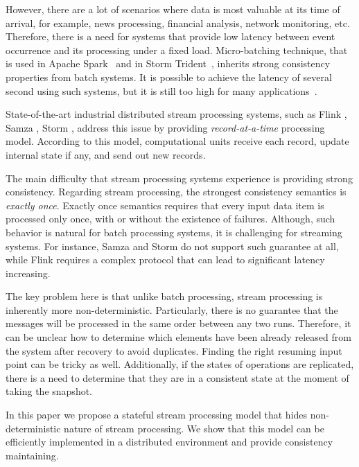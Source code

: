 \documentclass[sigconf]{acmart}
\theoremstyle{remark}
\begin{document}
However, there are a lot of scenarios where data is most valuable at its time of arrival, for example, news processing, financial analysis, network monitoring, etc. Therefore, there is a need for systems that provide low latency between event occurrence and its processing under a fixed load. Micro-batching technique, that is used in Apache Spark~\cite{Zaharia:2012:DSE:2342763.2342773} and in Storm Trident~\cite{apache:storm:trident}, inherits strong consistency properties from batch systems. It is possible to achieve the latency of several second using such systems, but it is still too high for many applications~\cite{?}.

State-of-the-art industrial distributed stream processing systems, such as Flink \cite{carbone2015apache}, Samza \cite{Noghabi:2017:SSS:3137765.3137770}, Storm \cite{apache:storm}, address this issue by providing {\it record-at-a-time} processing model. According to this model, computational units receive each record, update internal state if any, and send out new records. 

The main difficulty that stream processing systems experience is providing strong consistency. Regarding stream processing, the strongest consistency semantics is {\it exactly once}. Exactly once semantics requires that every input data item is processed only once, with or without the existence of failures. Although, such behavior is natural for batch processing systems, it is challenging for streaming systems. For instance, Samza and Storm do not support such guarantee at all, while Flink requires a complex protocol that can lead to significant latency increasing.

The key problem here is that unlike batch processing, stream processing is inherently more non-deterministic. Particularly, there is no guarantee that the messages will be processed in the same order between any two runs. Therefore, it can be unclear how to determine which elements have been already released from the system after recovery to avoid duplicates. Finding the right resuming input point can be tricky as well. Additionally, if the states of operations are replicated, there is a need to determine that they are in a consistent state at the moment of taking the snapshot. 

In this paper we propose a stateful stream processing model that hides non-deterministic nature of stream processing. We show that this model can be efficiently implemented in a distributed environment and provide consistency maintaining.
\end{document}
